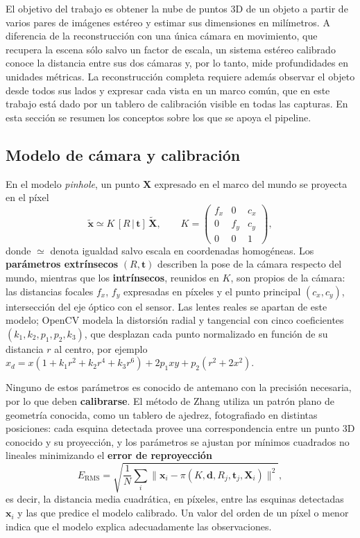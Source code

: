 \documentclass[10pt,a4paper,twocolumn]{article}
\begin{document}
El objetivo del trabajo es obtener la nube de puntos 3D de un objeto a partir de varios pares de imágenes estéreo y estimar sus dimensiones en milímetros. A diferencia de la reconstrucción con una única cámara en movimiento, que recupera la escena sólo salvo un factor de escala, un sistema estéreo calibrado conoce la distancia entre sus dos cámaras y, por lo tanto, mide profundidades en unidades métricas. La reconstrucción completa requiere además observar el objeto desde todos sus lados y expresar cada vista en un marco común, que en este trabajo está dado por un tablero de calibración visible en todas las capturas. En esta sección se resumen los conceptos sobre los que se apoya el pipeline.

\subsection{Modelo de cámara y calibración}
\label{sec:pinhole}

En el modelo \emph{pinhole}, un punto $\mathbf{X}$ expresado en el marco del mundo se proyecta en el píxel
\begin{equation}
\tilde{\mathbf{x}} \simeq K\,[R\,|\,\mathbf{t}]\,\tilde{\mathbf{X}},\qquad
K=\begin{pmatrix} f_x & 0 & c_x\\ 0 & f_y & c_y\\ 0&0&1\end{pmatrix},
\label{eq:pinhole}
\end{equation}
donde $\simeq$ denota igualdad salvo escala en coordenadas homogéneas. Los \textbf{parámetros extrínsecos} $(R,\mathbf{t})$ describen la pose de la cámara respecto del mundo, mientras que los \textbf{intrínsecos}, reunidos en $K$, son propios de la cámara: las distancias focales $f_x$, $f_y$ expresadas en píxeles y el punto principal $(c_x,c_y)$, intersección del eje óptico con el sensor. Las lentes reales se apartan de este modelo; OpenCV modela la distorsión radial y tangencial con cinco coeficientes $(k_1,k_2,p_1,p_2,k_3)$, que desplazan cada punto normalizado en función de su distancia $r$ al centro, por ejemplo $x_d = x(1+k_1r^2+k_2r^4+k_3r^6)+2p_1xy+p_2(r^2+2x^2)$.

Ninguno de estos parámetros es conocido de antemano con la precisión necesaria, por lo que deben \textbf{calibrarse}. El método de Zhang \cite{zhang} utiliza un patrón plano de geometría conocida, como un tablero de ajedrez, fotografiado en distintas posiciones: cada esquina detectada provee una correspondencia entre un punto 3D conocido y su proyección, y los parámetros se ajustan por mínimos cuadrados no lineales minimizando el \textbf{error de reproyección}
\begin{equation}
E_{\mathrm{RMS}}=\sqrt{\frac{1}{N}\sum_{i}\bigl\lVert \mathbf{x}_i-\pi(K,\mathbf{d},R_j,\mathbf{t}_j,\mathbf{X}_i)\bigr\rVert^2},
\label{eq:rms}
\end{equation}
es decir, la distancia media cuadrática, en píxeles, entre las esquinas detectadas $\mathbf{x}_i$ y las que predice el modelo calibrado. Un valor del orden de un píxel o menor indica que el modelo explica adecuadamente las observaciones.
\end{document}
